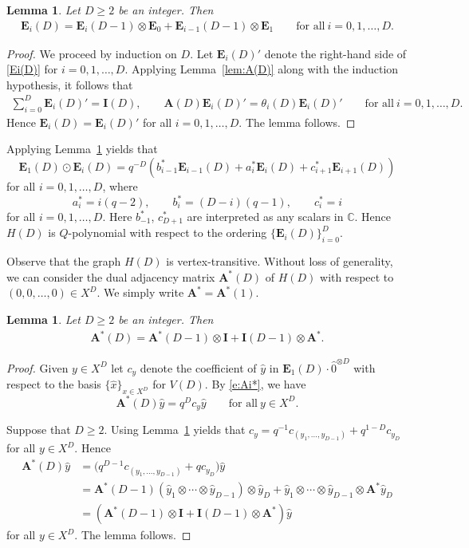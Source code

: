 \documentclass[pdftex]{sigma}%
\def\A{\mathbf A}
\def\E{\mathbf E}
\def\C{\mathbb C}
\def\I{\mathbf I}
\numberwithin{equation}{section}
\newtheorem{Lemma}[Theorem]{Lemma}
\begin{document}
\begin{Lemma}\label{lem:Ei(D)}
Let $D\geq 2$ be an integer. Then
\begin{gather}\label{Ei(D)}
\E_i(D)=\E_i(D-1)\otimes \E_0+\E_{i-1}(D-1)\otimes \E_1
\qquad
\text{for all}\ i=0,1,\dots,D.
\end{gather}
\end{Lemma}

\begin{proof}
We proceed by induction on $D$.
Let $\E_i(D)'$ denote the right-hand side of \eqref{Ei(D)} for $i=0,1,\dots,D$.
Applying Lemma~\ref{lem:A(D)} along with the induction hypothesis, it follows that
\begin{gather*}
\sum_{i=0}^D \E_i(D)' =\I(D),
\qquad
\A(D) \E_i(D)'=\theta_i(D)\E_i(D)'
\qquad \text{for all}\ i=0,1,\dots,D.
\end{gather*}
Hence $\E_i(D)=\E_i(D)'$ for all $i=0,1,\dots,D$. The lemma follows.
\end{proof}



Applying Lemma~\ref{lem:Ei(D)} yields that
\[
\E_1(D)\odot \E_i(D)=
q^{-D}(b_{i-1}^* \E_{i-1}(D)+a_i^* \E_i(D)+c_{i+1}^* \E_{i+1}(D))
\]
for all $i=0,1,\dots,D$, where
\[
a_i^*=i(q-2),\qquad
b_i^*=(D-i)(q-1),\qquad
c_i^*=i
\]
for all $i=0,1,\dots,D$. Here $b_{-1}^*$, $c_{D+1}^*$ are interpreted as any scalars in $\C$.
Hence $H(D)$ is $Q$-polynomial with respect to the ordering $\{\E_i(D)\}_{i=0}^D$.

Observe that the graph $H(D)$ is vertex-transitive. Without loss of generality, we can consider the dual adjacency matrix $\A^*(D)$ of $H(D)$ with respect to $(0,0,\dots,0)\in X^D$. We simply write $\A^*=\A^*(1)$.

\begin{Lemma}\label{lem:A*(D)}
Let $D\geq 2$ be an integer. Then
\begin{gather*}
\A^*(D)=\A^*(D-1)\otimes \I+\I(D-1)\otimes \A^*.
\end{gather*}
\end{Lemma}

\begin{proof}
Given $y\in X^D$ let $c_y$ denote the coefficient of $\hat y$ in $\E_1(D) \cdot \hat 0^{\otimes D}$ with respect to the basis $\{\hat x\}_{x\in X^D}$ for $V(D)$. By \eqref{e:Ai*}, we have
\[
\A^*(D)\hat y=q^D c_y \hat y\qquad
\text{for all}\ y\in X^D.
\]

Suppose that $D\geq 2$.
Using Lemma~\ref{lem:Ei(D)} yields that
$c_y=q^{-1} c_{(y_1,\dots,y_{D-1})}+q^{1-D} c_{y_D}$ for all $y\in X^D$.
Hence
\begin{align*}
\A^*(D)\hat y
&=\big(q^{D-1} c_{(y_1,\dots,y_{D-1})}+q c_{y_D}\big) \hat y
\\
&=\A^*(D-1) (\hat y_1\otimes \cdots \otimes \hat y_{D-1})\otimes \hat y_D+\hat y_1\otimes \cdots \otimes \hat y_{D-1}\otimes \A^* \hat y_D
\\
&=(\A^*(D-1)\otimes \I+\I(D-1)\otimes \A^*) \hat y
\end{align*}
for all $y\in X^D$. The lemma follows.
\end{proof}
\end{document}
